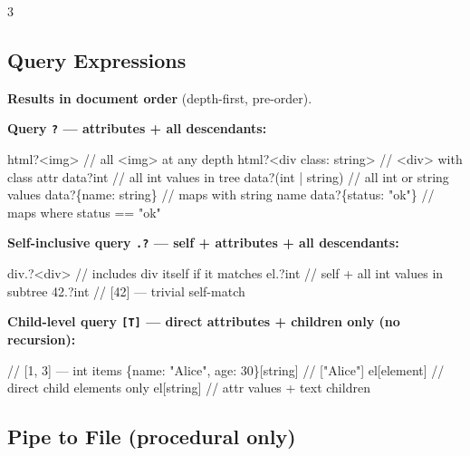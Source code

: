 \documentclass[8pt,landscape,a4paper,oneside]{article}
\newenvironment{Shaded}{%
  \begin{snugshade}%
  \vspace{0.4\baselineskip}%
  \fontsize{9}{10}\selectfont%
  \setlength{\parskip}{0pt}%
  \setlength{\topsep}{0pt}%
  \setlength{\partopsep}{0pt}%
}{%
  \vspace{0.01\baselineskip}%
  \end{snugshade}%
}
\newcommand{\NormalTok}[1]{#1}
\begin{document}
\begin{multicols*}{3}
\subsection{Query Expressions}\label{query-expressions}

\textbf{Results in document order} (depth-first, pre-order).

\textbf{Query \texttt{?} --- attributes + all descendants:}

\begin{Shaded}
\begin{Highlighting}[]
\NormalTok{html?\textless{}img\textgreater{}                // all \textless{}img\textgreater{} at any depth}
\NormalTok{html?\textless{}div class: string\textgreater{}  // \textless{}div\textgreater{} with class attr}
\NormalTok{data?int                  // all int values in tree}
\NormalTok{data?(int | string)       // all int or string values}
\NormalTok{data?\{name: string\}       // maps with string \textquotesingle{}name\textquotesingle{}}
\NormalTok{data?\{status: "ok"\}       // maps where status == "ok"}
\end{Highlighting}
\end{Shaded}

\textbf{Self-inclusive query \texttt{.?} --- self + attributes + all
descendants:}

\begin{Shaded}
\begin{Highlighting}[]
\NormalTok{div.?\textless{}div\textgreater{}     // includes div itself if it matches}
\NormalTok{el.?int        // self + all int values in subtree}
\NormalTok{42.?int        // [42] — trivial self{-}match}
\end{Highlighting}
\end{Shaded}

\textbf{Child-level query \texttt{{[}T{]}} --- direct attributes +
children only (no recursion):}

\begin{Shaded}
\begin{Highlighting}[]
\NormalTok{[1, "a", 3, true][int]   // [1, 3] — int items}
\NormalTok{\{name: "Alice", age: 30\}[string]  // ["Alice"]}
\NormalTok{el[element]     // direct child elements only}
\NormalTok{el[string]      // attr values + text children}
\end{Highlighting}
\end{Shaded}

\subsection{Pipe to File (procedural
only)}\label{pipe-to-file-procedural-only}


\end{multicols*}
\end{document}
